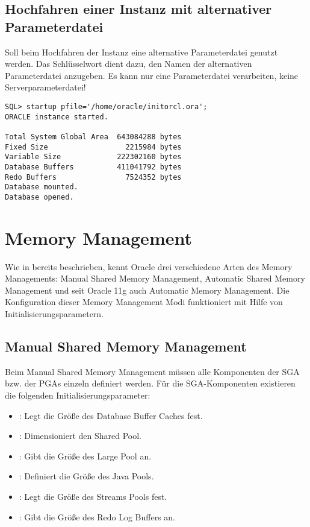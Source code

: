       \subsection{Hochfahren einer Instanz mit alternativer Parameterdatei}
        Soll beim Hochfahren der Instanz eine alternative Parameterdatei genutzt werden.          Das Schlüsselwort  dient dazu, den Namen der alternativen Parameterdatei anzugeben. Es kann nur eine Parameterdatei verarbeiten, keine Serverparameterdatei!
        \begin{lstlisting}[caption={Start mit alternativer Parameterdatei},label=admin21,language=sqlplus]
SQL> startup pfile='/home/oracle/initorcl.ora';
ORACLE instance started.

Total System Global Area  643084288 bytes
Fixed Size                  2215984 bytes
Variable Size             222302160 bytes
Database Buffers          411041792 bytes
Redo Buffers                7524352 bytes
Database mounted.
Database opened.
        \end{lstlisting}
        \begin{literaturinternet}
          \item \cite{i1006091}
        \end{literaturinternet}

    \section{Memory Management}
      Wie in  bereits beschrieben, kennt Oracle drei verschiedene Arten des Memory Managements: Manual Shared Memory Management, Automatic Shared Memory Management und seit Oracle 11g auch Automatic Memory Management. Die Konfiguration dieser Memory Management Modi funktioniert mit Hilfe von Initialisierungsparametern.
      \subsection{Manual Shared Memory Management}
        Beim Manual Shared Memory Management müssen alle Komponenten der SGA bzw. der PGAs einzeln definiert werden. Für die SGA-Komponenten existieren die folgenden Initialisierungsparameter:
        \begin{itemize}
          \item {}: Legt die Größe des Database Buffer Caches fest.
          \item {}: Dimensioniert den Shared Pool.
          \item {}: Gibt die Größe des Large Pool an.
          \item {}: Definiert die Größe des Java Pools.
          \item {}: Legt die Größe des Streams Pools fest.
          \item {}: Gibt die Größe des Redo Log Buffers an.
        \end{itemize}
   
